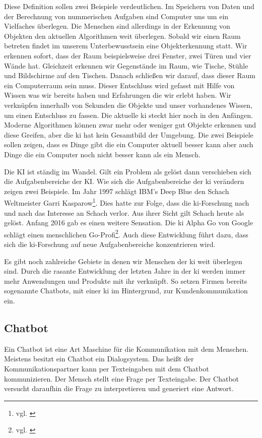 Diese Definition sollen zwei Beispiele verdeutlichen.\newline
Im Speichern von Daten und der Berechnung von nummerischen Aufgaben sind Computer uns um ein Vielfaches überlegen. \newline
Die Menschen sind allerdings in der Erkennung von Objekten den aktuellen Algorithmen weit überlegen. Sobald wir einen Raum betreten findet im unserem Unterbewusstsein eine Objekterkennung statt. Wir erkennen sofort, dass der Raum beispielsweise drei Fenster, zwei Türen und vier Wände hat. Gleichzeit erkennen wir Gegenstände im Raum, wie Tische, Stühle und Bildschirme auf den Tischen. Danach schließen wir darauf, dass dieser Raum ein Computerraum sein muss. Dieser Entschluss wird gefasst mit Hilfe von Wissen was wir bereits haben und Erfahrungen die wir erlebt haben. Wir verknüpfen innerhalb von Sekunden die Objekte und unser vorhandenes Wissen, um einen Entschluss zu fassen. \newline 
Die aktuelle \ac{ki} steckt hier noch in den Anfängen. Moderne Algorithmen können zwar mehr oder weniger gut Objekte erkennen und diese Greifen, aber die \ac{ki} hat kein Gesamtbild der Umgebung. Die zwei Beispiele sollen zeigen, dass es Dinge gibt die ein Computer aktuell besser kann aber auch Dinge die ein Computer noch nicht besser kann als ein Mensch. 

Die KI ist ständig im Wandel. Gilt ein Problem als gelöst dann verschieben sich die Aufgabenbereiche der KI.   
Wie sich die Aufgabenbereiche der \ac{ki} verändern zeigen zwei Beispiele. Im Jahr 1997 schlägt IBM's Deep Blue den Schach Weltmeister Garri Kasparow\footnote{vgl. \cite{SchachQuelle}}. Dies hatte zur Folge, dass die \ac{ki}-Forschung nach und nach das Interesse an Schach verlor. Aus ihrer Sicht gilt Schach heute als gelöst. \newline
Anfang 2016 gab es einen weitere Sensation. Die \ac{ki} Alpha Go von Google schlägt einen menschlichen Go-Profi\footnote{vgl. \cite{GoQuelle}}. Auch diese Entwicklung führt dazu, dass sich die \ac{ki}-Forschung auf neue Aufgabenbereiche konzentrieren wird. 

Es gibt noch zahlreiche Gebiete in denen wir Menschen der \ac{ki} weit überlegen sind. Durch die rasante Entwicklung der letzten Jahre in der \ac{ki} werden immer mehr Anwendungen und Produkte mit ihr verknüpft. So setzen Firmen bereits sogenannte Chatbots, mit einer \ac{ki} im Hintergrund, zur Kundenkommunikation ein.

\subsection{Chatbot}
Ein Chatbot ist eine Art Maschine für die Kommunikation mit dem Menschen. Meistens besitzt ein Chatbot ein Dialogsystem. Das heißt der Kommunikationspartner kann per Texteingaben mit dem Chatbot kommunizieren. Der Mensch stellt eine Frage per Texteingabe. Der Chatbot versucht daraufhin die Frage zu interpretieren und generiert eine Antwort.

